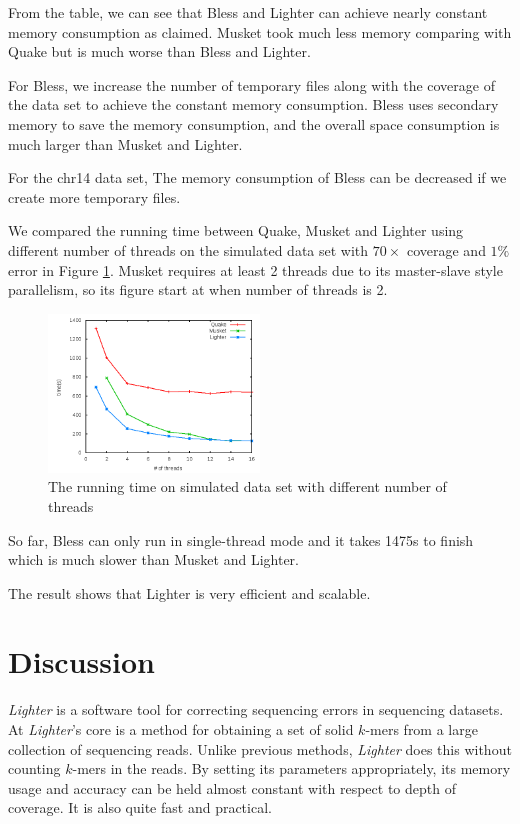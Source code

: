 \documentclass[10pt]{article}
\begin{document}
From the table, we can see that Bless and Lighter can achieve nearly constant memory consumption as claimed. Musket took much less memory comparing with Quake but is much worse than Bless and Lighter.

For Bless, we increase the number of temporary files along with the coverage of the data set to achieve the constant memory consumption. Bless uses secondary memory to save the memory consumption, and the overall space consumption is much larger than Musket and Lighter. 

For the chr14 data set, The memory consumption of Bless can be decreased if we create more temporary files. 

We compared the running time between Quake, Musket and Lighter using different number of threads on the simulated data set with $70\times$ coverage and $1\%$ error in Figure \ref{fig:runtime}. Musket requires at least 2 threads due to its master-slave style parallelism, so its figure start at when number of threads is 2. 

\begin{figure}[h!]
\begin{center}
\includegraphics[width=0.5\textwidth]{runtime.png}
\end{center}
\caption{The running time on simulated data set with different number of threads\label{fig:runtime}}
\end{figure}

So far, Bless can only run in single-thread mode and it takes 1475s to finish which is much slower than Musket and Lighter.

The result shows that Lighter is very efficient and scalable. 

\section*{Discussion}
\emph{Lighter} is a software tool for correcting sequencing errors in sequencing datasets.
At \emph{Lighter}'s core is a method for obtaining a set of solid $k$-mers from a large collection of sequencing reads.
Unlike previous methods, \emph{Lighter} does this without counting $k$-mers in the reads.
By setting its parameters appropriately, its memory usage and accuracy can be held almost constant with respect to depth of coverage.
It is also quite fast and practical.
\end{document}
